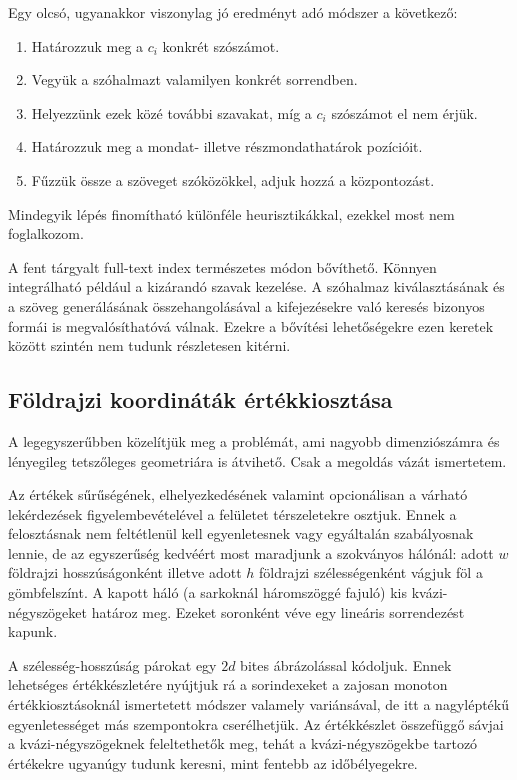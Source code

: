\documentclass[
    parspace,
    noindent,
    nohyp,
]{elteiktdk}[2023/04/10]
\begin{document}
Egy olcsó, ugyanakkor viszonylag jó eredményt adó módszer a következő:

\begin{enumerate}
    \item Határozzuk meg a $c_i$ konkrét szószámot.
    \item Vegyük a szóhalmazt valamilyen konkrét sorrendben.
    \item Helyezzünk ezek közé további szavakat, míg a $c_i$ szószámot el nem érjük.
    \item Határozzuk meg a mondat- illetve részmondathatárok pozícióit.
    \item Fűzzük össze a szöveget szóközökkel, adjuk hozzá a központozást.
\end{enumerate}

Mindegyik lépés finomítható különféle heurisztikákkal,
ezekkel most nem foglalkozom.

A fent tárgyalt full-text index természetes módon bővíthető.
Könnyen integrálható például a kizárandó szavak kezelése.
A szóhalmaz kiválasztásának és a szöveg generálásának összehangolásával
a kifejezésekre való keresés bizonyos formái is megvalósíthatóvá válnak.
Ezekre a bővítési lehetőségekre ezen keretek között szintén nem tudunk részletesen kitérni.

\subsection{Földrajzi koordináták értékkiosztása}

A legegyszerűbben közelítjük meg a problémát,
ami nagyobb dimenziószámra és lényegileg tetszőleges geometriára is átvihető.
Csak a megoldás vázát ismertetem.

Az értékek sűrűségének, elhelyezkedésének valamint opcionálisan a várható lekérdezések
figyelembevételével a felületet térszeletekre osztjuk.
Ennek a felosztásnak nem feltétlenül kell egyenletesnek vagy egyáltalán szabályosnak lennie,
de az egyszerűség kedvéért most maradjunk a szokványos hálónál:
adott $w$ földrajzi hosszúságonként illetve adott $h$ földrajzi szélességenként vágjuk föl a gömbfelszínt.
A kapott háló (a sarkoknál háromszöggé fajuló) kis kvázi-négyszögeket határoz meg.
Ezeket soronként véve egy lineáris sorrendezést kapunk.

A szélesség-hosszúság párokat egy $2d$ bites ábrázolással kódoljuk.
Ennek lehetséges értékkészletére nyújtjuk rá a sorindexeket
a zajosan monoton értékkiosztásoknál ismertetett módszer valamely variánsával,
de itt a nagyléptékű egyenletességet más szempontokra cserélhetjük.
Az értékkészlet összefüggő sávjai a kvázi-négyszögeknek feleltethetők meg,
tehát a kvázi-négyszögekbe tartozó értékekre ugyanúgy tudunk keresni,
mint fentebb az időbélyegekre.
\end{document}
